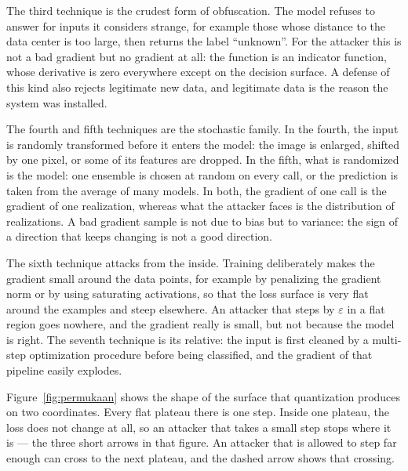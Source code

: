The third technique is the crudest form of obfuscation. The model refuses to answer for inputs it
considers strange, for example those whose distance to the data center is too large, then returns the
label ``unknown''. For the attacker this is not a bad gradient but no gradient at all: the function
is an indicator function, whose derivative is zero everywhere except on the decision surface. A
defense of this kind also rejects legitimate new data, and legitimate data is the reason the system
was installed.

The fourth and fifth techniques are the stochastic family. In the fourth, the input is randomly
transformed before it enters the model: the image is enlarged, shifted by one pixel, or some of its
features are dropped. In the fifth, what is randomized is the model: one ensemble is chosen at random
on every call, or the prediction is taken from the average of many models. In both, the gradient of
one call is the gradient of one realization, whereas what the attacker faces is the distribution of
realizations. A bad gradient sample is not due to bias but to variance: the sign of a direction that
keeps changing is not a good direction.

The sixth technique attacks from the inside. Training deliberately makes the
gradient small around the data points, for example by penalizing the gradient norm or
by using saturating activations, so that the loss surface is very flat around the examples
and steep elsewhere. An attacker that steps by $\varepsilon$ in a flat region
goes nowhere, and the gradient really is small, but not because the model is right.
The seventh technique is its relative: the input is first cleaned by a multi-step
optimization procedure before being classified, and the gradient of that pipeline easily
explodes.

Figure~\ref{fig:permukaan} shows the shape of the surface that quantization
produces on two coordinates. Every flat plateau there is one step. Inside
one plateau, the loss does not change at all, so an attacker that takes a small
step stops where it is --- the three short arrows in that figure. An attacker that is allowed
to step far enough can cross to the next plateau, and the dashed arrow
shows that crossing.

